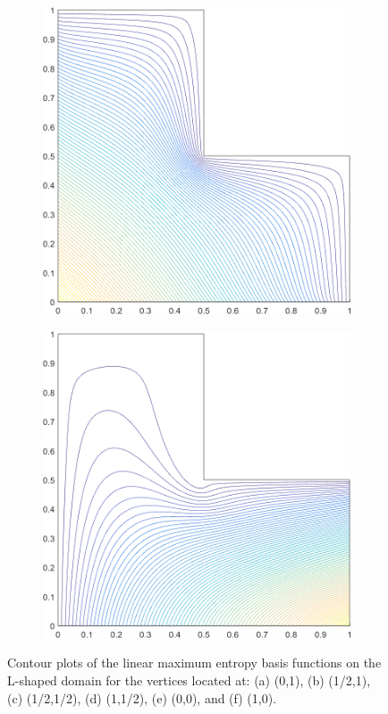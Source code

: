 \begin{figure}
\begin{subfigure}[b]{0.39\textwidth}
		\caption{}
	\end{subfigure}
	\vfill
	\begin{subfigure}[b]{0.39\textwidth}
		\centering
		\includegraphics[width=\textwidth]{figures/sec_BF/L-domain_MAXENT1_contour_b1.png}
		\caption{}
	\end{subfigure}
	\hspace{1.5cm}
	\begin{subfigure}[b]{0.39\textwidth}
		\centering
		\includegraphics[width=\textwidth]{figures/sec_BF/L-domain_MAXENT1_contour_b2.png}
		\caption{}
	\end{subfigure}
\caption{Contour plots of the linear maximum entropy basis functions on the L-shaped domain for the vertices located at: (a) (0,1), (b) (1/2,1), (c) (1/2,1/2), (d) (1,1/2), (e) (0,0), and (f) (1,0).}
\end{figure}

